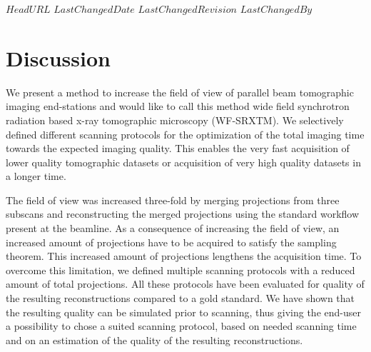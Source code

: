 \svnidlong
{$HeadURL$}
{$LastChangedDate$}
{$LastChangedRevision$}
{$LastChangedBy$}
%
%
\section{Discussion}\label{sec:Discussion}%

We present a method to increase the field of view of parallel beam tomographic imaging end-stations  and would like to call this method wide field synchrotron radiation based x-ray tomographic microscopy (WF-SRXTM). We selectively defined different scanning protocols for the optimization of the total imaging time towards the expected imaging quality. This enables the very fast acquisition of lower quality tomographic datasets or acquisition of very high quality datasets in a longer time.

The field of view was increased three-fold by merging projections from three subscans and reconstructing the merged projections using the standard workflow present at the beamline. As a consequence of increasing the field of view, an increased amount of projections have to be acquired to satisfy the sampling theorem. This increased amount of projections lengthens the acquisition time. To overcome this limitation, we defined multiple scanning protocols with a reduced amount of total projections. All these protocols have been evaluated for quality of the resulting reconstructions compared to a gold standard. We have shown that the resulting quality can be simulated prior to scanning, thus giving the end-user a possibility to chose a suited scanning protocol, based on needed scanning time and on an estimation of the quality of the resulting reconstructions.

